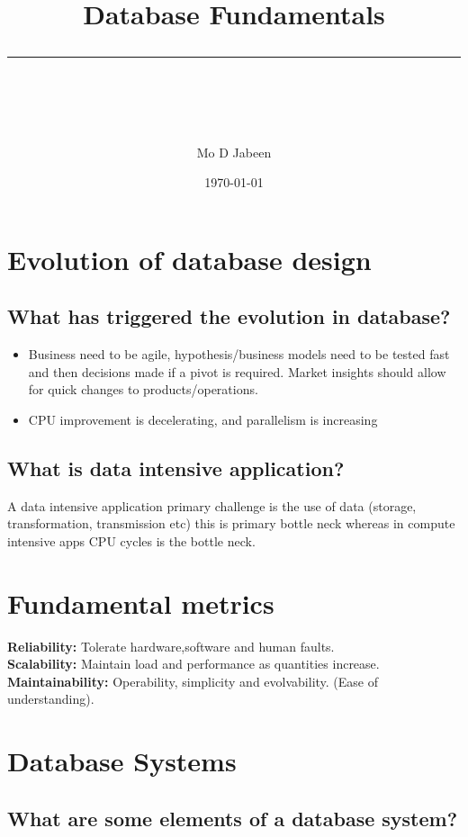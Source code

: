 \documentclass[11pt]{scrartcl} %
\title{	
	\normalfont\normalsize
	\vspace{20pt} %
	{\huge Database Fundamentals}\\ %
	\vspace{12pt} %
	\rule{\linewidth}{2pt}\\ %
}
\author{\small Mo D Jabeen} %
\date{\normalsize\today} %
\begin{document}
\maketitle %

\section{Evolution of database design}

\subsection{What has triggered the evolution in database?}

\begin{itemize}
	\item Business need to be agile, hypothesis/business models need to be tested fast and then
	decisions made if a pivot is required. Market insights should allow for quick changes to products/operations.
	\item CPU improvement is decelerating, and parallelism is increasing
\end{itemize}

\subsection{What is data intensive application?}

A data intensive application primary challenge is the use of data (storage, transformation, transmission etc)
this is primary bottle neck whereas in compute intensive apps CPU cycles is the bottle neck.

\section{Fundamental metrics}

\textbf{Reliability:} Tolerate hardware,software and human faults.\\
\textbf{Scalability:} Maintain load and performance as quantities increase.\\
\textbf{Maintainability:} Operability, simplicity and evolvability. (Ease of understanding).

\section{Database Systems}

\subsection{What are some elements of a database system?}
\end{document}
